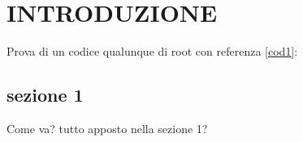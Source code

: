 \chapter{INTRODUZIONE}
Prova di un codice qualunque di root con referenza \ref{cod1}:\\


\section{sezione 1}
Come va? tutto apposto nella sezione 1?